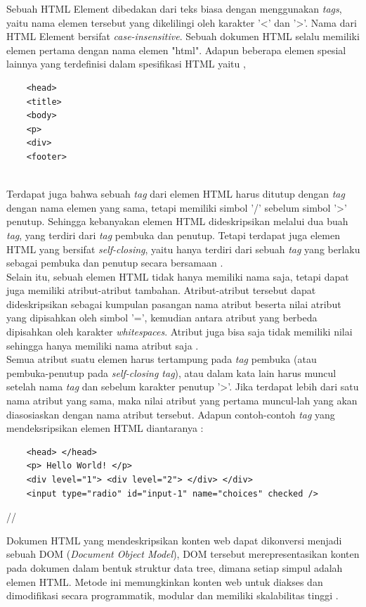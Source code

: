 \documentclass[12pt,a4paper]{article}
\begin{document}
Sebuah HTML Element dibedakan dari teks biasa dengan menggunakan \textit{tags}, yaitu nama elemen tersebut yang dikelilingi oleh karakter '<' dan '>'.
Nama dari HTML Element bersifat \textit{case-insensitive}. Sebuah dokumen HTML selalu memiliki elemen pertama dengan nama elemen "html".
Adapun beberapa elemen spesial lainnya yang terdefinisi dalam spesifikasi HTML yaitu \cite{mozilla-html},
\begin{verbatim}
    <head>
    <title>
    <body>
    <p>
    <div>
    <footer>
\end{verbatim} \\

Terdapat juga bahwa sebuah \textit{tag} dari elemen HTML harus ditutup dengan \textit{tag} dengan nama elemen yang sama,
tetapi memiliki simbol '/' sebelum simbol '>' penutup. Sehingga kebanyakan elemen HTML dideskripsikan melalui dua buah \textit{tag}, yang terdiri dari \textit{tag} pembuka dan penutup. 
Tetapi terdapat juga elemen HTML yang bersifat \textit{self-closing}, yaitu hanya terdiri dari sebuah \textit{tag} yang berlaku sebagai pembuka dan penutup secara bersamaan \cite{mozilla-html}. \\

Selain itu, sebuah elemen HTML tidak hanya memiliki nama saja, tetapi dapat juga memiliki atribut-atribut tambahan.
Atribut-atribut tersebut dapat dideskripsikan sebagai kumpulan pasangan nama atribut beserta nilai atribut yang dipisahkan oleh simbol '=',
kemudian antara atribut yang berbeda dipisahkan oleh karakter \textit{whitespaces}. Atribut juga bisa saja tidak memiliki nilai sehingga hanya memiliki nama atribut saja \cite{mozilla-html}. \\


Semua atribut suatu elemen harus tertampung pada \textit{tag} pembuka (atau pembuka-penutup pada \textit{self-closing tag}), atau dalam kata lain harus muncul setelah nama \textit{tag} dan sebelum karakter penutup '>'.
Jika terdapat lebih dari satu nama atribut yang sama, maka nilai atribut yang pertama muncul-lah yang akan diasosiaskan dengan nama atribut tersebut.
Adapun contoh-contoh \textit{tag} yang mendeksripsikan elemen HTML diantaranya \cite{mozilla-html}:
\begin{verbatim}
    <head> </head>
    <p> Hello World! </p>
    <div level="1"> <div level="2"> </div> </div>
    <input type="radio" id="input-1" name="choices" checked />
\end{verbatim} //


Dokumen HTML yang mendeskripsikan konten web dapat dikonversi menjadi sebuah DOM (\textit{Document Object Model}),
DOM tersebut merepresentasikan konten pada dokumen dalam bentuk struktur data tree, dimana setiap simpul adalah elemen HTML.
Metode ini memungkinkan konten web untuk diakses dan dimodifikasi secara programmatik, modular dan memiliki skalabilitas tinggi \cite{mozilla-dom}. \\
\end{document}
